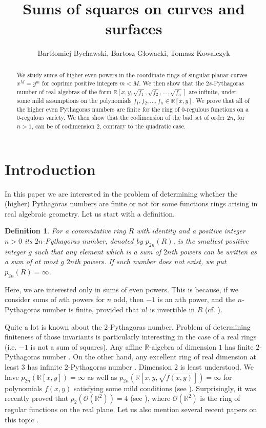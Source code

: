 \documentclass[12pt,reqno]{amsart}   	%
\title{Sums of squares on curves and surfaces}
\author{Bartłomiej Bychawski, Bartosz Głowacki, Tomasz  Kowalczyk}
\date{}
\newtheorem{df}[thm]{Definition}
\theoremstyle{remark}
\newcommand{\R}{\mathbb{R}}
\newcommand{\OO}{\mathcal{O}}
\begin{document}
\maketitle



\begin{abstract}
We study sums of higher even powers in the coordinate rings of singular planar curves $x^M=y^m$ for coprime positive integers $m<M$. We then show that the $2s$-Pythagoras number of real algebras of the form $\R[x,y,\sqrt{f_1},\sqrt{f_2},\dots, \sqrt{f_n}]$ are infinite, under some mild assumptions on the polynomials $f_1,f_2,\dots, f_n \in \R[x,y]$. We prove that all of the higher even Pythagoras numbers are finite for the ring of $0$-regulous functions on a $0$-regulous variety. We then show that the codimension of the bad set of order $2n$, for $n>1$, can be of codimension $2$, contrary to the quadratic case. 
\end{abstract}


\section*{Introduction}
In this paper we are interested in the problem of determining whether the (higher) Pythagoras numbers are finite or not for some functions rings arising in real algebraic geometry.
 Let us start with a definition.
 \begin{df}
For a commutative ring $R$ with identity and a positive integer $n>0$ its $2n$-Pythagoras number, denoted by $p_{2n}(R)$, is the smallest positive integer $g$ such that any element which is a sum of $2n$th powers can be written as a sum of at most $g$ $2n$th powers. If such number does not exist, we put $p_{2n}(R)=\infty$.
\end{df}
Here, we are interested only in sums of even powers. This is because, if we consider sums of $n$th powers for $n$ odd, then $-1$ is an $n$th power, and the $n$-Pythagoras number is finite, provided that $n!$ is invertible in $R$ (cf. \cite[Introduction]{km2024}).

Quite a lot is known about the $2$-Pythagoras number. Problem of determining finiteness of those invariants is particularly interesting in the case of a real rings (i.e. $-1$ is not a sum of squares). Any affine $\R$-algebra of dimension $1$ has finite $2$-Pythagoras number \cite{cldr1982}. On the other hand, any excellent ring of real dimension at least 3 has infinite $2$-Pythagoras number \cite{frs2004}. Dimension $2$ is least understood. We have $p_{2n}(\R[x,y])=\infty$ \cite{cldr1982, kv2023} as well as $p_{2n}(\R[x,y,\sqrt{f(x,y)}])=\infty$ for polynomials $f(x,y)$ satisfying some mild conditions (see \cite{bk2024, kv2023}). Surprisingly, it was recently proved that $p_2(\OO(\R^2))=4$ (see \cite{kowalczyk2025}), where $\OO(\R^2)$ is the ring of regular functions on the real plane. Let us also mention several recent papers on this topic \cite{benoist2025, bds2025, dghmy2026, dombek2025, hjp2025, krs2022, santiago2025,  tinkova2025}.
\end{document}

